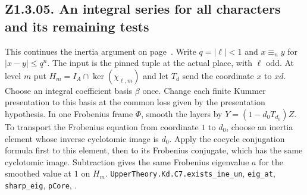 \subsection{Z1.3.05. An integral series for all characters and its remaining tests}
\label{r6:Z1.3.05}
This continues the inertia argument on page~\pageref{r5:Z1.3.05}. Write
$q=|\ell|<1$ and $x\equiv_n y$ for $|x-y|\le q^n$.
The input is the pinned tuple at the actual place, with $\ell$ odd.
At level $m$ put $H_m=I_A\cap\ker(\chi_{\ell,m})$ and let
$T_d$ send the coordinate $x$ to $xd$. Choose an integral coefficient
basis $\beta$ once. Change each finite Kummer presentation to this basis
at the common loss given by the presentation hypothesis. In one Frobenius
frame $\Phi$, smooth the layers by $Y=(1-d_0T_{d_0})Z$. To transport the
Frobenius equation from coordinate $1$ to $d_0$, choose an inertia element
whose inverse cyclotomic image is $d_0$. Apply the cocycle conjugation formula
first to this element, then to its Frobenius conjugate, which has the same
cyclotomic image. Subtraction gives the same Frobenius eigenvalue $a$ for
the smoothed value at $1$ on $H_m$.
{\footnotesize\nolinkurl{UpperTheory.Kd.C7.exists_ine_un},
\nolinkurl{eig_at}, \nolinkurl{sharp_eig}, \nolinkurl{pCore},
.}

